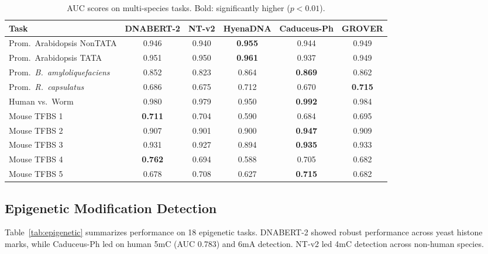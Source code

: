 \documentclass[11pt]{article}
\begin{document}
\begin{table}[ht]
\centering
\caption{AUC scores on multi-species tasks. Bold: significantly higher ($p < 0.01$).}
\label{tab:multispecies}
\begin{adjustbox}{max width=\textwidth}
\begin{tabular}{@{}lccccc@{}}
\toprule
Task & DNABERT-2 & NT-v2 & HyenaDNA & Caduceus-Ph & GROVER \\
\midrule
Prom.\ Arabidopsis NonTATA & 0.946 & 0.940 & \textbf{0.955} & 0.944 & 0.949 \\
Prom.\ Arabidopsis TATA & 0.951 & 0.950 & \textbf{0.961} & 0.937 & 0.949 \\
Prom.\ \emph{B.\ amyloliquefaciens} & 0.852 & 0.823 & 0.864 & \textbf{0.869} & 0.862 \\
Prom.\ \emph{R.\ capsulatus} & 0.686 & 0.675 & 0.712 & 0.670 & \textbf{0.715} \\
Human vs.\ Worm & 0.980 & 0.979 & 0.950 & \textbf{0.992} & 0.984 \\
Mouse TFBS 1 & \textbf{0.711} & 0.704 & 0.590 & 0.684 & 0.695 \\
Mouse TFBS 2 & 0.907 & 0.901 & 0.900 & \textbf{0.947} & 0.909 \\
Mouse TFBS 3 & 0.931 & 0.927 & 0.894 & \textbf{0.935} & 0.933 \\
Mouse TFBS 4 & \textbf{0.762} & 0.694 & 0.588 & 0.705 & 0.682 \\
Mouse TFBS 5 & 0.678 & 0.708 & 0.627 & \textbf{0.715} & 0.682 \\
\bottomrule
\end{tabular}
\end{adjustbox}
\end{table}

\subsection{Epigenetic Modification Detection}

Table~\ref{tab:epigenetic} summarizes performance on 18 epigenetic tasks.  DNABERT-2 showed robust performance across yeast histone marks, while Caduceus-Ph led on human 5mC (AUC 0.783) and 6mA detection.  NT-v2 led 4mC detection across non-human species.
\end{document}
